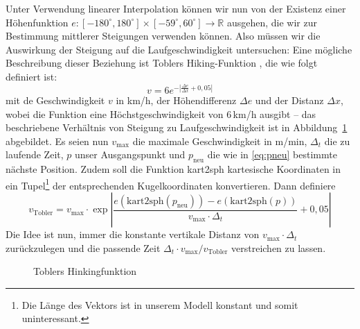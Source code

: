 \documentclass[
    paper=a4,
    DIV14,
    fontsize=12pt,
    pagesize=pdftex,
    toc=bibliographynumbered
]{scrartcl}
\numberwithin{figure}{section}
\numberwithin{equation}{section}
\numberwithin{table}{section}
\newcommand*\setR{\mathds{R}}
\begin{document}
Unter Verwendung linearer Interpolation können wir nun von der Existenz einer
Höhenfunktion $e : [-180^\circ, 180^\circ]\times[-59^\circ, 60^\circ] \to \setR$ ausgehen,
die wir zur Bestimmung mittlerer Steigungen verwenden können. Also müssen wir die
Auswirkung der Steigung auf die Laufgeschwindigkeit untersuchen: Eine mögliche
Beschreibung dieser Beziehung ist Toblers Hiking-Funktion \cite{wp:tobler}, die wie folgt
definiert ist:
\begin{equation*}
    v = 6e^{-\left| \frac{\Delta e}{\Delta x} + 0{,}05 \right|}
\end{equation*}
mit de Geschwindigkeit $v$ in km/h, der Höhendifferenz $\Delta e$ und der Distanz $\Delta
x$, wobei die Funktion eine Höchstgeschwindigkeit von 6\,km/h ausgibt -- das beschriebene
Verhältnis von Steigung zu Laufgeschwindigkeit ist in Abbildung~\ref{fig:tobler}
abgebildet. Es seien nun $v_{\text{max}}$ die maximale Geschwindigkeit in m/min,
$\Delta_t$ die zu laufende Zeit, $p$ unser Ausgangspunkt und $p_{\text{neu}}$ die wie in
\eqref{eq:pneu} bestimmte nächste Position. Zudem soll die Funktion kart2sph kartesische
Koordinaten in ein Tupel\footnote{Die Länge des Vektors ist in unserem Modell konstant und
somit uninteressant.} der entsprechenden Kugelkoordinaten konvertieren. Dann definiere
\begin{equation}
    v_{\text{Tobler}} = v_{\text{max}} \cdot \exp\left|
    \frac{e(\mathrm{kart2sph}(p_\text{neu})) - e(\mathrm{kart2sph}(p))}{v_{\text{max}}
    \cdot \Delta_t} + 0{,}05 \right|
    \label{eq:tobler}
\end{equation}
Die Idee ist nun, immer die konstante vertikale Distanz von $v_{\text{max}}\cdot\Delta_t$
zurückzulegen und die passende Zeit $\Delta_t \cdot v_{\text{max}} / v_{\text{Tobler}}$
verstreichen zu lassen.

\begin{figure}[htb]
    \centering
    \caption{Toblers Hinkingfunktion}
    \label{fig:tobler}
\end{figure}
\end{document}
